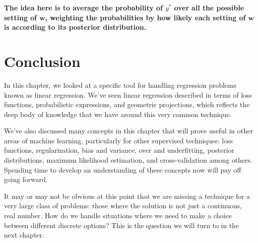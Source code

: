 \textbf{The idea here is to average the probability of $y^*$ over all the possible setting of $\bm{w}$, weighting the probabilities by how likely each setting of $\bm{w}$ is according to its posterior distribution.}

\section{Conclusion}
In this chapter, we looked at a specific tool for handling regression problems known as linear regression. We've seen linear regression described in terms of loss functions, probabilistic expressions, and geometric projections, which reflects the deep body of knowledge that we have around this very common technique.

We've also discussed many concepts in this chapter that will prove useful in other areas of machine learning, particularly for other supervised techniques: loss functions, regularization, bias and variance, over and underfitting, posterior distributions, maximum likelihood estimation, and cross-validation among others. Spending time to develop an understanding of these concepts now will pay off going forward.

It may or may not be obvious at this point that we are missing a technique for a very large class of problems: those where the solution is not just a continuous, real number. How do we handle situations where we need to make a choice between different discrete options? This is the question we will turn to in the next chapter.
